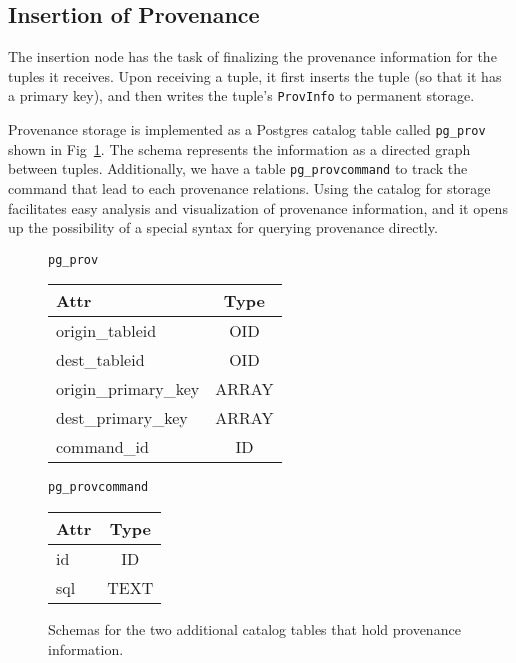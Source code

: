 \subsection{Insertion of Provenance}

The insertion node has the task of finalizing the provenance information for the tuples it receives. Upon receiving a tuple, it first inserts the tuple (so that it has a primary key), and then writes the tuple's \texttt{ProvInfo} to permanent storage. 

Provenance storage is implemented as a Postgres catalog table called \texttt{pg\_prov} shown in Fig~\ref{pgprov}. The schema represents the information as a directed graph between tuples. Additionally, we have a table \texttt{pg\_provcommand} to track the command that lead to each provenance relations. Using the catalog for storage facilitates easy analysis and visualization of provenance information, and it opens up the possibility of a special syntax for querying provenance directly. 

\begin{figure}
  \centering
  \label{pgprov}
\texttt{pg\_prov}\\

\begin{tabular}{|lc|}
  \hline
  Attr & Type \\
  \hline
  origin\_tableid & OID \\
  dest\_tableid & OID \\
  origin\_primary\_key & ARRAY \\
  dest\_primary\_key & ARRAY \\
  command\_id & ID \\
  \hline
\end{tabular}

\texttt{pg\_provcommand}\\

\begin{tabular}{|lc|}
  \hline
  Attr & Type \\
  \hline
  id & ID \\
  sql & TEXT \\
  \hline  
\end{tabular}
\caption{Schemas for the two additional catalog tables that hold provenance information.  }

\end{figure}
